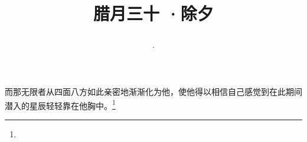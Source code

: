 \title{\date[d=9,m=2,y=2024][year:cn-y,年,month:cn,day:cn,日,·,weekday]·腊月三十 ·除夕}
而那无限者从四面八方如此亲密地渐渐化为他，使他得以相信自己感觉到在此期间潜入的星辰轻轻靠在他胸中。\footnote{ }

